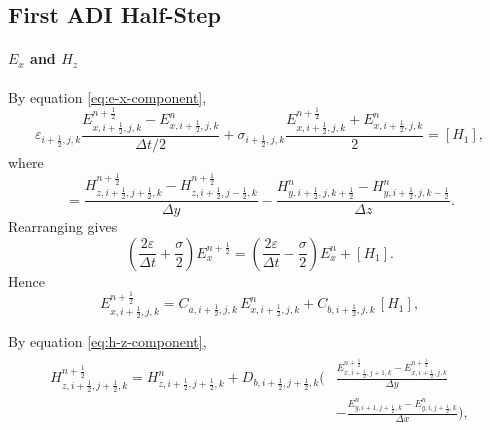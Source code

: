\documentclass{article}
\numberwithin{equation}{section}
\numberwithin{figure}{section}
\begin{document}
\subsection{First ADI Half-Step}

\paragraph{$E_x$ and $H_z$}
By equation \eqref{eq:e-x-component},
\begin{equation}
    \varepsilon_{i+\tfrac12,j,k} \frac{E_{x,i+\tfrac12,j,k}^{n+\frac12}-E_{x,i+\tfrac12,j,k}^{n}}{\Delta t/2} + \sigma_{i+\tfrac12,j,k} \frac{E_{x,i+\tfrac12,j,k}^{n+\frac12}+E_{x,i+\tfrac12,j,k}^{n}}{2} = [H_1],
    \label{eq:first-e-ex}
\end{equation}
where
\begin{equation}
    [H_1] = \frac{H_{z,i+\tfrac12,j+\tfrac12,k}^{n+\frac12}-H_{z,i+\tfrac12,j-\tfrac12,k}^{n+\frac12}}{\Delta y} - \frac{H_{y,i+\tfrac12,j,k+\tfrac12}^{n}-H_{y,i+\tfrac12,j,k-\tfrac12}^{n}}{\Delta z}.
    \label{eq:first-h-1}
\end{equation}
Rearranging gives
\begin{equation}
    \left(\frac{2\varepsilon}{\Delta t}+\frac{\sigma}{2}\right) E_{x}^{n+\frac12} = \left(\frac{2\varepsilon}{\Delta t}-\frac{\sigma}{2}\right) E_{x}^{n} + [H_1].
\end{equation}
Hence
\begin{equation}
    E_{x,i+\tfrac12,j,k}^{n+\frac12} = C_{a,i+\tfrac12,j,k}\,E_{x,i+\tfrac12,j,k}^{n} + C_{b,i+\tfrac12,j,k}\,[H_1],
    \label{eq:first-e-ex-adi}
\end{equation}

By equation \eqref{eq:h-z-component},
\begin{align}
    \begin{split}
        H_{z,i+\tfrac12,j+\tfrac12,k}^{n+\frac12} = H_{z,i+\tfrac12,j+\tfrac12,k}^{n} + D_{b,i+\tfrac12,j+\tfrac12,k}\Big( & \frac{E_{x,i+\tfrac12,j+1,k}^{n+\frac12}-E_{x,i+\tfrac12,j,k}^{n+\frac12}}{\Delta y} \\
                                                                                                                           & - \frac{E_{y,i+1,j+\tfrac12,k}^{n}-E_{y,i,j+\tfrac12,k}^{n}}{\Delta x}\Big),
    \end{split}
\end{align}
\end{document}
